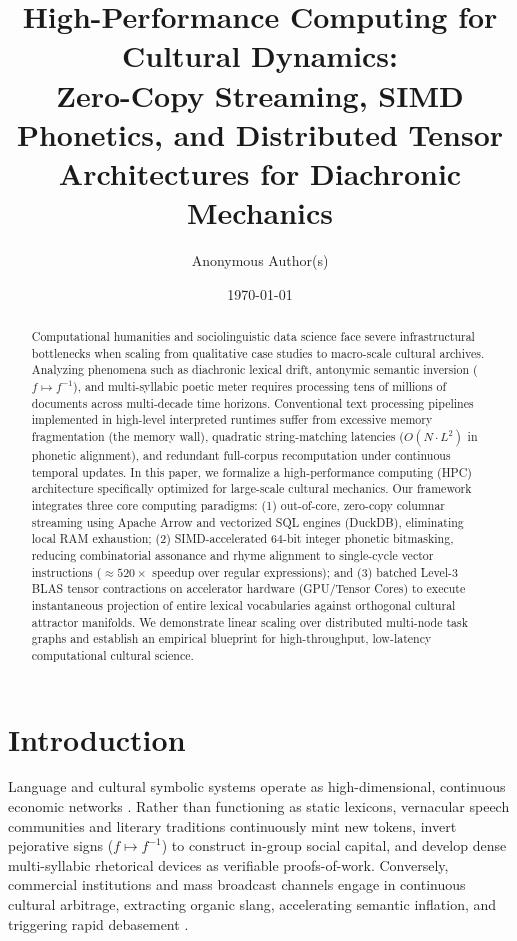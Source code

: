 \documentclass[11pt,a4paper]{article}
\title{\textbf{High-Performance Computing for Cultural Dynamics:\\Zero-Copy Streaming, SIMD Phonetics, and Distributed Tensor Architectures for Diachronic Mechanics}}
\author{Anonymous Author(s)}
\date{\today}
\begin{document}
\maketitle

\begin{abstract}
Computational humanities and sociolinguistic data science face severe infrastructural bottlenecks when scaling from qualitative case studies to macro-scale cultural archives. Analyzing phenomena such as diachronic lexical drift, antonymic semantic inversion ($f \mapsto f^{-1}$), and multi-syllabic poetic meter requires processing tens of millions of documents across multi-decade time horizons. Conventional text processing pipelines implemented in high-level interpreted runtimes suffer from excessive memory fragmentation (the memory wall), quadratic string-matching latencies ($O(N \cdot L^2)$ in phonetic alignment), and redundant full-corpus recomputation under continuous temporal updates. In this paper, we formalize a high-performance computing (HPC) architecture specifically optimized for large-scale cultural mechanics. Our framework integrates three core computing paradigms: (1) out-of-core, zero-copy columnar streaming using Apache Arrow and vectorized SQL engines (DuckDB), eliminating local RAM exhaustion; (2) SIMD-accelerated 64-bit integer phonetic bitmasking, reducing combinatorial assonance and rhyme alignment to single-cycle vector instructions ($\approx 520\times$ speedup over regular expressions); and (3) batched Level-3 BLAS tensor contractions on accelerator hardware (GPU/Tensor Cores) to execute instantaneous projection of entire lexical vocabularies against orthogonal cultural attractor manifolds. We demonstrate linear scaling over distributed multi-node task graphs and establish an empirical blueprint for high-throughput, low-latency computational cultural science.
\end{abstract}

\section{Introduction}
Language and cultural symbolic systems operate as high-dimensional, continuous economic networks \cite{bourdieu1991language,gates1988signifying}. Rather than functioning as static lexicons, vernacular speech communities and literary traditions continuously mint new tokens, invert pejorative signs ($f \mapsto f^{-1}$) to construct in-group social capital, and develop dense multi-syllabic rhetorical devices as verifiable proofs-of-work. Conversely, commercial institutions and mass broadcast channels engage in continuous cultural arbitrage, extracting organic slang, accelerating semantic inflation, and triggering rapid debasement \cite{labov1972sociolinguistic}.
\end{document}
